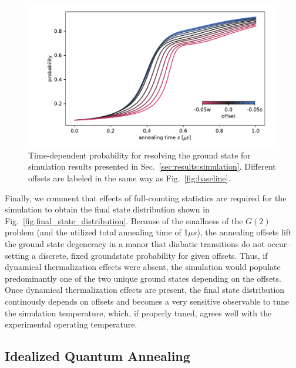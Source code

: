 \documentclass[prd,twocolumn,tightenlines,preprintnumbers,showpacs,superscriptaddress,notitlepage,nofootinbib,eqsecnum,floatfix,longbibliography,aps,10pt]{revtex4-1}
\begin{document}
\begin{figure}
	\centering
	\includegraphics[width=\columnwidth]{./time_dependent_probability.pdf}
	\caption{Time-dependent probability for resolving the ground state for simulation results presented in Sec.~\ref{sec:results:simulation}. Different offsets are labeled in the same way as Fig.~\ref{fig:baseline}.}
	\label{fig:td_prob}
\end{figure}

Finally, we comment that effects of full-counting statistics are required for the simulation to obtain the final state distribution shown in Fig.~\ref{fig:final_state_distribution}.
Because of the smallness of the $G(2)$ problem (and the utilized total annealing time of 1$\mu s$), the annealing offsets lift the ground state degeneracy in a manor that diabatic transitions do not occur--setting a discrete, fixed groundstate probability for given offsets.
Thus, if dynamical thermalization effects were absent, the simulation would populate predominantly one of the two unique ground states depending on the offsets.
Once dynamical thermalization effects are present, the final state distribution  continously depends on offsets and becomes a very sensitive observable to tune the simulation temperature, which, if properly tuned, agrees well with the experimental operating temperature.


\subsection{Idealized Quantum Annealing}
\label{sec:discussion:idealqa}
\end{document}
